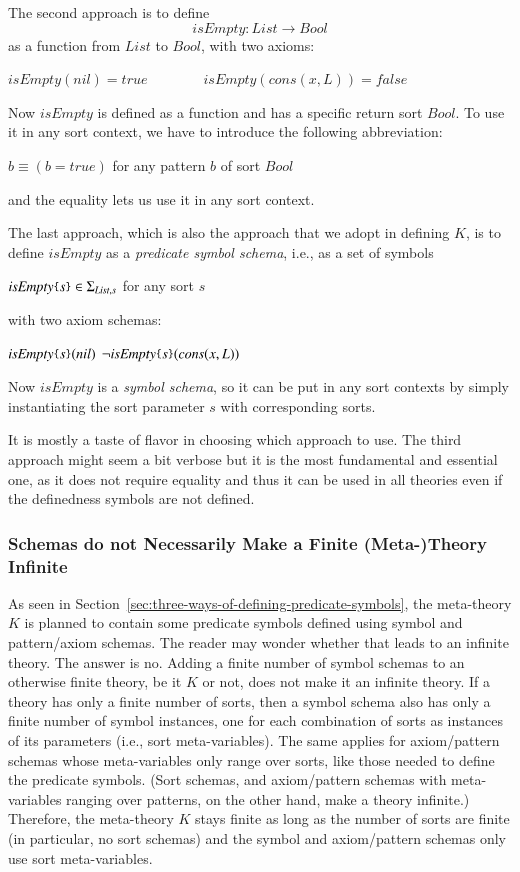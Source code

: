 \documentclass[UTF8,11pt]{article}
\theoremstyle{plain}
\theoremstyle{definition}
\theoremstyle{remark}
\newcommand{\Bool}{\textit{Bool}}
\newcommand{\List}{\textit{List}}
\newcommand{\nil}{\textit{nil}}
\newcommand{\cons}{\textit{cons}}
\newcommand{\ittrue}{\textit{true}}
\newcommand{\itfalse}{\textit{false}}
\newcommand{\parametric}[2]{{#1}\raisebox{.2ex}{\texttt{\footnotesize{\{}}}#2\raisebox{.2ex}{\texttt{\footnotesize{\}}}}}
\newcommand{\isEmpty}{\textit{isEmpty}}
\begin{document}
The second approach is to define
$$ \isEmpty \colon \List \to \Bool $$
as a function from $\List$ to $\Bool$, with two axioms:
\begin{center}
 $isEmpty(\nil)=\ittrue \qquad\qquad \isEmpty(\cons(x,L)) = \itfalse$
\end{center}
Now $\isEmpty$ is defined as a function and has a specific return sort $\Bool$.
To use it in any sort context, we have to introduce the following abbreviation:
\begin{center}
 $b \equiv (b = \ittrue)$ \qquad for any pattern $b$ of sort $\Bool$
\end{center}
and the equality lets us use it in any sort context.

The last approach, which is also the approach that we adopt in defining $K$, is
to define $\isEmpty$ as a \emph{predicate symbol schema}, i.e., as a set of
symbols
\begin{center}
 $\parametric{\isEmpty}{s} \in \Sigma_{\List,s}$ \qquad for any sort $s$
\end{center}
with two axiom schemas:
\begin{center}
 $\parametric{\isEmpty}{s}(\nil)$
 \qquad\qquad
 $\neg \parametric{\isEmpty}{s}(\cons(x,L))$
\end{center}
Now $\isEmpty$ is a \emph{symbol schema}, so it can be put in any
sort contexts by simply instantiating the sort parameter $s$ with corresponding
sorts.

It is mostly a taste of flavor in choosing which approach to use.
The third approach might seem a bit verbose but it is the most fundamental and
essential one, as it does not require equality and thus it can be used in
all theories even if the definedness symbols are not defined.

\subsubsection{Schemas do not Necessarily Make a Finite (Meta-)Theory Infinite}
\label{sec:symbol-schema-finitary}

As seen in Section~\ref{sec:three-ways-of-defining-predicate-symbols},
the meta-theory $K$ is planned to contain some predicate symbols defined
using symbol and pattern/axiom schemas.
The reader may wonder whether that leads to an infinite theory.
The answer is no.
Adding a finite number of symbol schemas to an otherwise finite theory,
be it $K$ or not, does not make it an infinite theory.
If a theory has only a finite number of sorts, then a symbol schema also
has only a finite number of symbol instances, one for each combination of
sorts as instances of its parameters (i.e., sort meta-variables).
The same applies for axiom/pattern schemas whose meta-variables only range
over sorts, like those needed to define the predicate symbols.
(Sort schemas, and axiom/pattern schemas with meta-variables ranging over
patterns, on the other hand, make a theory infinite.)
Therefore, the meta-theory $K$ stays finite as long as the number of sorts are
finite (in particular, no sort schemas) and the symbol and axiom/pattern
schemas only use sort meta-variables.
\end{document}
